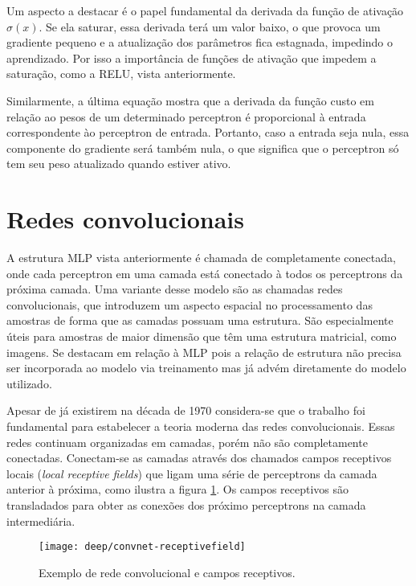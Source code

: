 Um aspecto a destacar é o papel fundamental da derivada da função de ativação $\sigma(x)$. Se ela saturar, essa derivada terá um valor baixo, o que provoca um gradiente pequeno e a atualização dos parâmetros fica estagnada, impedindo o aprendizado. Por isso a importância de funções de ativação que impedem a saturação, como a RELU, vista anteriormente.

Similarmente, a última equação mostra que a derivada da função custo em relação ao pesos de um determinado perceptron é proporcional à entrada correspondente ào perceptron de entrada. Portanto, caso a entrada seja nula, essa componente do gradiente será também nula, o que significa que o perceptron só tem seu peso atualizado quando estiver ativo.

\section{Redes convolucionais}
\label{sec:convnets}

A estrutura MLP vista anteriormente é chamada de completamente conectada, onde cada perceptron em uma camada está conectado à todos os perceptrons da próxima camada. Uma variante desse modelo são as chamadas redes convolucionais, que introduzem um aspecto espacial no processamento das amostras de forma que as camadas possuam uma estrutura. São especialmente úteis para amostras de maior dimensão que têm uma estrutura matricial, como imagens. Se destacam em relação à MLP pois a relação de estrutura não precisa ser incorporada ao modelo via treinamento mas já advém diretamente do modelo utilizado.

Apesar de já existirem na década de 1970 considera-se que o trabalho \cite{lecun1998convnet} foi fundamental para estabelecer a teoria moderna das redes convolucionais. Essas redes continuam organizadas em camadas, porém não são completamente conectadas. Conectam-se as camadas através dos chamados campos receptivos locais (\textit{local receptive fields}) que ligam uma série de perceptrons da camada anterior à próxima, como ilustra a figura \ref{fig:convnet-receptivefield}. Os campos receptivos são transladados para obter as conexões dos próximo perceptrons na camada intermediária.

\begin{figure}[h]
\centering
\texttt{[image: deep/convnet-receptivefield]}
\caption{Exemplo de rede convolucional e campos receptivos.}
\label{fig:convnet-receptivefield}
\end{figure}

